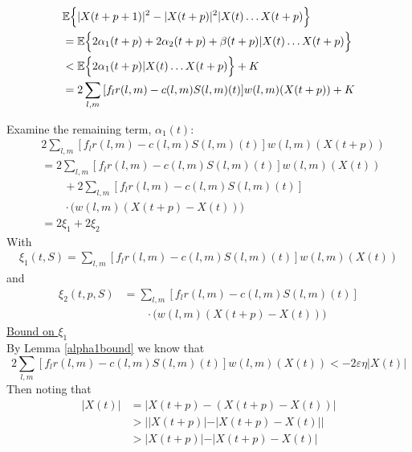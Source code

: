 \begin{align}
\nonumber
&\expectation{\vert X(t + p + 1)\vert^2 - \vert X(t + p)\vert^2 \vert X(t) \ldots X(t + p)} \\
\nonumber
& = \expectation{ 2\alpha_{1} (t+p) + 2\alpha_{2}(t+p) +\beta (t+p)    \vert  X(t) \ldots X(t + p)  }\\
\nonumber
&< \expectation{2\alpha_{1} (t+p) \vert X(t) \ldots X(t + p) } + K \\
&= 2\sum_{l,m} {[f_{l}r(l,m) - c(l,m)S(l,m)(t) ]w(l,m)(X(t + p))} + K \label{withK}
\end{align}

Examine the remaining  term, $\alpha_1(t)$: %
\begin{align} \nonumber 
&2\sum_{l,m} [f_{l}  r(l,m) -  c(l,m)S(l,m)(t) ]  w(l,m)(X(t + p))   \\ \nonumber
&=  2\sum_{l,m} [f_{l}r(l,m) - c(l,m)S(l,m)(t) ]w(l,m)(X(t) )  \\ \nonumber
& \qquad  + 2\sum_{l,m} [f_{l}r(l,m) - c(l,m)S(l,m)(t) ] \\ \nonumber 
&\qquad \cdot \big(w(l,m)(X(t + p ) - X(t))\big) \\ \nonumber
&= 2 \xi_{1} + 2 \xi_{2}
\label{2terms}
\end{align}
With
\begin{align} 
\xi_{1} (t,S) = \sum_{l,m} \left[f_{l}r(l,m) - c(l,m)S(l,m)(t) \right]w(l,m)(X(t) )
\end{align}
and
\begin{align}\nonumber
\xi_{2} (t,p,S) &= \sum_{l,m} \left[f_{l}r(l,m) - c(l,m)S(l,m)(t) \right]\\
&\qquad \cdot\big(w(l,m)(X(t + p ) - X(t))\big)
\end{align}
\underline{Bound on $\xi_{1}$} \\
By Lemma \ref{alpha1bound} we know that
\begin{equation*}
2\sum_{l,m} [f_{l}r(l,m) - c(l,m)S(l,m)(t) ]w(l,m)(X(t )) < -2\varepsilon \eta \vert X(t) \vert
\end{equation*}
Then noting that
\begin{align*}
\vert X(t) \vert &= \vert X(t + p) - (X(t + p) - X(t)) \vert \\
&> \big\vert \vert X(t + p) \vert - \vert  X(t + p) - X(t)   \vert  \big\vert \\
&>  \vert X(t + p) \vert - \vert  X(t + p) - X(t)   \vert  
\end{align*}
